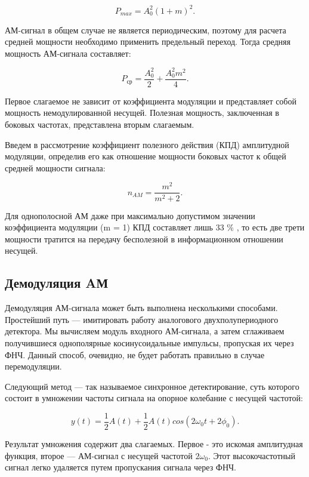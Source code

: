 \documentclass[a4paper,14pt]{article}
\begin{document}
\[
	P_{max} = A_0^2 (1 + m)^2.
\]

\hspace{0,5cm} АМ-сигнал в общем случае не является периодическим, поэтому для расчета средней мощности необходимо применить предельный переход. Тогда средняя мощность АМ-сигнала составляет:

\[
	P_{ср} = \frac{A_0^2}{2} + \frac{A_0^2 m^2}{4}.
\]

\hspace{0,5cm}Первое слагаемое не зависит от коэффициента модуляции и представляет собой
мощность немодулированной несущей. Полезная мощность, заключенная в боковых частотах, представлена вторым слагаемым.

\hspace{0,5cm}Введем в рассмотрение коэффициент полезного действия (КПД) амплитудной модуляции, определив его как отношение мощности боковых частот к общей
средней мощности сигнала:

\[
	n_{AM} = \frac{m^2}{m^2+2} .
\]

\hspace{0,5cm}Для однополосной АМ даже при максимально допустимом значении коэффициента модуляции (m = 1) КПД составляет лишь 33 \% , то есть две трети мощности тратится на передачу бесполезной в информационном отношении несущей.

\subsection{Демодуляция AМ}

\hspace{0,5cm}Демодуляция АМ-сигнала может быть выполнена несколькими способами.
Простейший путь — имитировать работу аналогового двухполупериодного детектора. Мы вычисляем модуль входного АМ-сигнала, а затем сглаживаем получившиеся однополярные косинусоидальные импульсы, пропуская их через ФНЧ. Данный способ, очевидно, не будет работать правильно в случае перемодуляции.

\hspace{0,5cm}Следующий метод — так называемое синхронное детектирование, суть которого
состоит в умножении частоты сигнала на опорное колебание с несущей частотой:

\begin{equation}
	y(t) = \frac{1}{2} A(t) + \frac{1}{2}A(t)cos(2\omega_0t+2\phi_0).
\end{equation}

\hspace{0,5cm}Результат умножения содержит два слагаемых. Первое - это искомая
амплитудная функция, второе — АМ-сигнал с несущей частотой $2\omega_0$. Этот
высокочастотный сигнал легко удаляется путем пропускания сигнала через ФНЧ.
\end{document}
